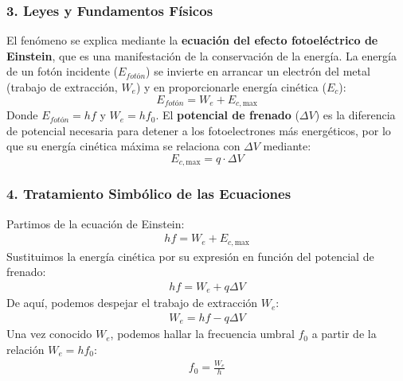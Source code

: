 \subsubsection*{3. Leyes y Fundamentos Físicos}
El fenómeno se explica mediante la \textbf{ecuación del efecto fotoeléctrico de Einstein}, que es una manifestación de la conservación de la energía. La energía de un fotón incidente ($E_{fotón}$) se invierte en arrancar un electrón del metal (trabajo de extracción, $W_e$) y en proporcionarle energía cinética ($E_c$):
\[ E_{fotón} = W_e + E_{c, \text{max}} \]
Donde $E_{fotón} = hf$ y $W_e = hf_0$. El \textbf{potencial de frenado} ($\Delta V$) es la diferencia de potencial necesaria para detener a los fotoelectrones más energéticos, por lo que su energía cinética máxima se relaciona con $\Delta V$ mediante:
\[ E_{c, \text{max}} = q \cdot \Delta V \]

\subsubsection*{4. Tratamiento Simbólico de las Ecuaciones}
Partimos de la ecuación de Einstein:
\begin{gather}
    hf = W_e + E_{c, \text{max}}
\end{gather}
Sustituimos la energía cinética por su expresión en función del potencial de frenado:
\begin{gather}
    hf = W_e + q \Delta V
\end{gather}
De aquí, podemos despejar el trabajo de extracción $W_e$:
\begin{gather}
    W_e = hf - q \Delta V \label{eq:trabajo_extraccion}
\end{gather}
Una vez conocido $W_e$, podemos hallar la frecuencia umbral $f_0$ a partir de la relación $W_e = hf_0$:
\begin{gather}
    f_0 = \frac{W_e}{h} \label{eq:frecuencia_umbral}
\end{gather}


